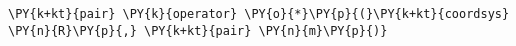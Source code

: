 \begin{Verbatim}[commandchars=\\\{\}]
    \PY{k+kt}{pair} \PY{k}{operator} \PY{o}{*}\PY{p}{(}\PY{k+kt}{coordsys} \PY{n}{R}\PY{p}{,} \PY{k+kt}{pair} \PY{n}{m}\PY{p}{)}
\end{Verbatim}
